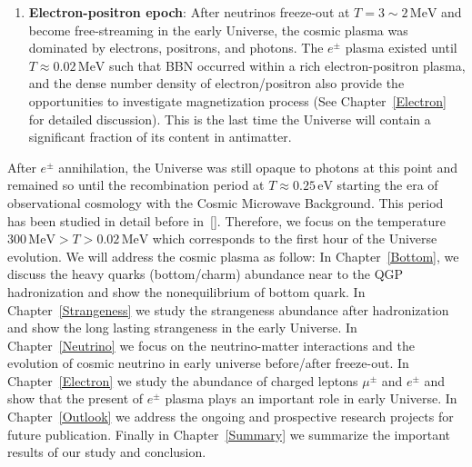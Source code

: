 \begin{enumerate}
    \item \textbf{Electron-positron epoch}: After neutrinos freeze-out at $T=3\sim2\,\mathrm{MeV}$ and become free-streaming in the early Universe, the cosmic plasma was dominated by electrons, positrons, and photons. The $e^\pm$ plasma existed until $T\approx0.02\,\mathrm{MeV}$ such that BBN occurred within a rich electron-positron plasma, and the dense number density of electron/positron also provide the opportunities to investigate magnetization process (See Chapter~\ref{Electron} for detailed discussion). This is the last time the Universe will contain a significant fraction of its content in antimatter.
\end{enumerate}
After $e^\pm$ annihilation, the Universe was still opaque to photons at this point and remained so until the recombination period at $T\approx0.25\,\mathrm{eV}$ starting the era of observational cosmology with the Cosmic Microwave Background. This period has been studied in detail before in~[\cite{Planck:2018vyg}]. Therefore, we focus on the temperature $300\,\mathrm{MeV}>T>0.02\,\mathrm{MeV}$ which corresponds to the first hour of the Universe evolution. We will address the cosmic plasma as follow: In Chapter~\ref{Bottom}, we discuss the heavy quarks (bottom/charm) abundance near to the QGP hadronization and show the nonequilibrium of bottom quark.  In Chapter~\ref{Strangeness} we study the strangeness abundance after hadronization and show the long lasting strangeness in the early Universe. In Chapter~\ref{Neutrino} we focus on the neutrino-matter interactions and the evolution of cosmic neutrino in early universe before/after freeze-out. In Chapter~\ref{Electron} we study the abundance of charged leptons $\mu^\pm$ and $e^\pm$ and show that the present of $e^\pm$ plasma plays an important role in early Universe. In Chapter~\ref{Outlook} we address the ongoing and prospective research projects for future publication.
Finally in Chapter~\ref{Summary} we summarize the important results of our study and conclusion.



